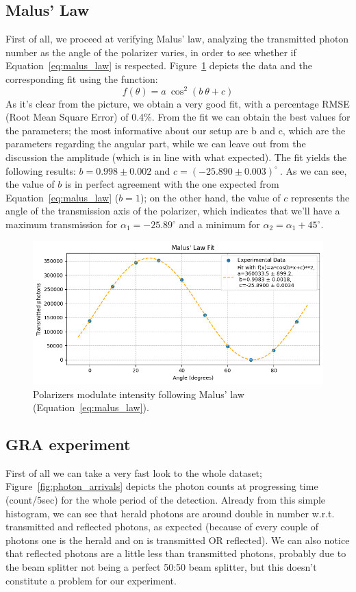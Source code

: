 \documentclass[prl,twocolumn]{revtex4-1}
\begin{document}
\subsection{Malus' Law}
First of all, we proceed at verifying Malus' law, analyzing the transmitted photon number as the angle of the polarizer varies, in order to see whether if Equation~\eqref{eq:malus_law} is respected. Figure~\ref{fig:malus_law} depicts the data and the corresponding fit using the function:
%
\begin{equation}
    f(\theta) = a\:\cos^2(b\:\theta + c)
\end{equation}
%
As it's clear from the picture, we obtain a very good fit, with a percentage RMSE (Root Mean Square Error) of 0.4\%. From the fit we can obtain the best values for the parameters; the most informative about our setup are b and c, which are the parameters regarding the angular part, while we can leave out from the discussion the amplitude (which is in line with what expected). The fit yields the following results: $b = 0.998 \pm 0.002$ and $c = (-25.890 \pm 0.003)^\circ \:$. As we can see, the value of $b$ is in perfect agreement with the one expected from Equation~\eqref{eq:malus_law} ($b=1$); on the other hand, the value of $c$ represents the angle of the transmission axis of the polarizer, which indicates that we'll have a maximum transmission for $\alpha_1 = -25.89^\circ$ and a minimum for $\alpha_2 = \alpha_1 + 45^\circ$.

\begin{figure}[!b]
    \centering
    \includegraphics[width=\linewidth]{Images/malus_law.png}
    \caption{Polarizers modulate intensity following Malus' law (Equation~\eqref{eq:malus_law}).}
    \label{fig:malus_law}
\end{figure}

\subsection{GRA experiment}
First of all we can take a very fast look to the whole dataset; Figure~\ref{fig:photon_arrivals} depicts the photon counts at progressing time (count/5sec) for the whole period of the detection. Already from this simple histogram, we can see that herald photons are around double in number w.r.t. transmitted and reflected photons, as expected (because of every couple of photons one is the herald and on is transmitted OR reflected). We can also notice that reflected photons are a little less than transmitted photons, probably due to the beam splitter not being a perfect 50:50 beam splitter, but this doesn't constitute a problem for our experiment.
\end{document}
